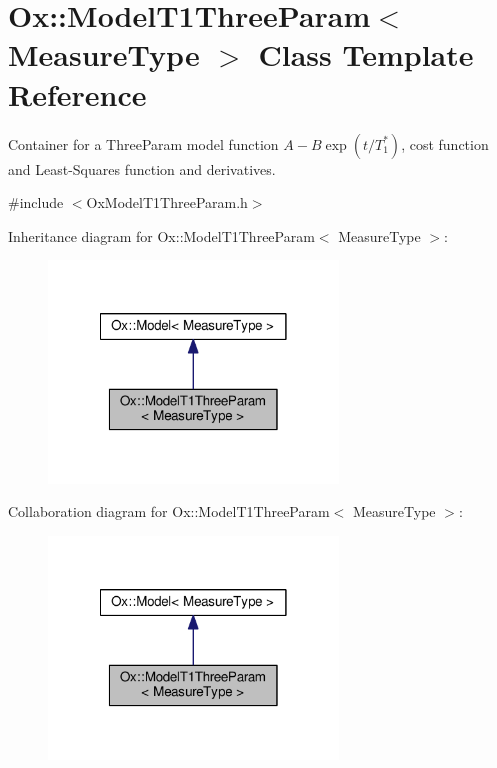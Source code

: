 \hypertarget{class_ox_1_1_model_t1_three_param}{\section{Ox\-:\-:Model\-T1\-Three\-Param$<$ Measure\-Type $>$ Class Template Reference}
\label{class_ox_1_1_model_t1_three_param}
}


Container for a Three\-Param model function $ A-B\exp(t/T_1^*) $, cost function and Least-\/\-Squares function and derivatives.  




{\ttfamily \#include $<$Ox\-Model\-T1\-Three\-Param.\-h$>$}



Inheritance diagram for Ox\-:\-:Model\-T1\-Three\-Param$<$ Measure\-Type $>$\-:
\nopagebreak
\begin{figure}[H]
\begin{center}
\leavevmode
\includegraphics[width=218pt]{class_ox_1_1_model_t1_three_param__inherit__graph}
\end{center}
\end{figure}


Collaboration diagram for Ox\-:\-:Model\-T1\-Three\-Param$<$ Measure\-Type $>$\-:
\nopagebreak
\begin{figure}[H]
\begin{center}
\leavevmode
\includegraphics[width=218pt]{class_ox_1_1_model_t1_three_param__coll__graph}
\end{center}
\end{figure}
